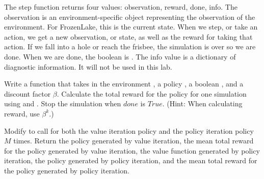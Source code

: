 The step function returns four values: observation, reward, done, info.
The observation is an environment-specific object representing the observation of the environment.
For FrozenLake, this is the current state.
When we step, or take an action, we get a new observation, or state, as well as the reward for taking that action.
If we fall into a hole or reach the frisbee, the simulation is over so we are done.
When we are done, the boolean  is .
The info value is a dictionary of diagnostic information.
It will not be used in this lab.

\begin{problem}
\label{prob:policyiter-value6}
Write a function  that takes in the environment , a policy , a boolean , and a discount factor $\beta$.
Calculate the total reward for the policy for one simulation using  and .
Stop the simulation when $done$ is $True$.
(Hint: When calculating reward, use $\beta^k$.)

Modify  to call  for both the value iteration policy and the policy iteration policy $M$ times.
Return the policy generated by value iteration, the mean total reward for the policy generated by value iteration, the value function generated by policy iteration, the policy generated by policy iteration, and the mean total reward for the policy generated by policy iteration.
\end{problem}


